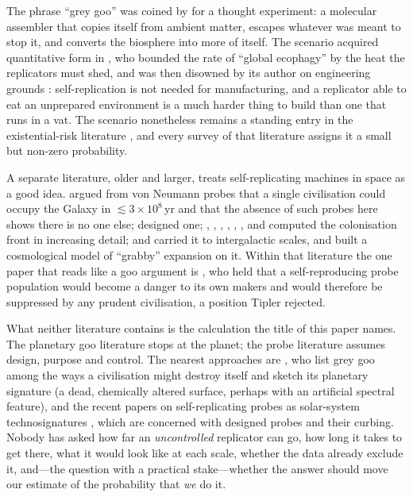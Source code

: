 \documentclass[11pt]{article}
\begin{document}
The phrase ``grey goo'' was coined by \citet{Drexler1986} for a thought
experiment: a molecular assembler that copies itself from ambient matter,
escapes whatever was meant to stop it, and converts the biosphere into more of
itself.  The scenario acquired quantitative form in \citet{Freitas2000}, who
bounded the rate of ``global ecophagy'' by the heat the replicators must shed,
and was then disowned by its author on engineering grounds
\citep{PhoenixDrexler2004}: self-replication is not needed for manufacturing,
and a replicator able to eat an unprepared environment is a much harder thing
to build than one that runs in a vat.  The scenario nonetheless remains a
standing entry in the existential-risk literature \citep{Bostrom2002,Rees2003,
Ord2020}, and every survey of that literature assigns it a small but non-zero
probability.

A separate literature, older and larger, treats self-replicating machines in
space as a good idea.  \citet{Tipler1980} argued from von Neumann probes that a
single civilisation could occupy the Galaxy in $\lesssim3\times10^{8}$\,yr and that the
absence of such probes here shows there is no one else; \citet{Freitas1980}
designed one; \citet{Hart1975}, \citet{NewmanSagan1981}, \citet{Landis1998},
\citet{Bjork2007}, \citet{CottaMorales2009}, \citet{Wiley2011},
\citet{NicholsonForgan2013} and \citet{CarrollNellenback2019} computed the
colonisation front in increasing detail; \citet{ArmstrongSandberg2013} and
\citet{Olson2015} carried it to intergalactic scales, and
\citet{Hanson2021} built a cosmological model of ``grabby'' expansion on it.
Within that literature the one paper that reads like a goo argument is
\citet{SaganNewman1983}, who held that a self-reproducing probe population
would become a danger to its own makers and would therefore be suppressed by
any prudent civilisation, a position Tipler rejected.

What neither literature contains is the calculation the title of this paper
names.  The planetary goo literature stops at the planet; the probe literature
assumes design, purpose and control.  The nearest approaches are
\citet{Stevens2016}, who list grey goo among the ways a civilisation might
destroy itself and sketch its planetary signature (a dead, chemically altered
surface, perhaps with an artificial spectral feature), and the recent papers on
self-replicating probes as solar-system technosignatures
\citep{Ellery2022a,Ellery2022b,Ellery2025}, which are concerned with designed
probes and their curbing.  Nobody has asked how far an \emph{uncontrolled}
replicator can go, how long it takes to get there, what it would look like at
each scale, whether the data already exclude it, and---the question with a
practical stake---whether the answer should move our estimate of the
probability that \emph{we} do it.
\end{document}
